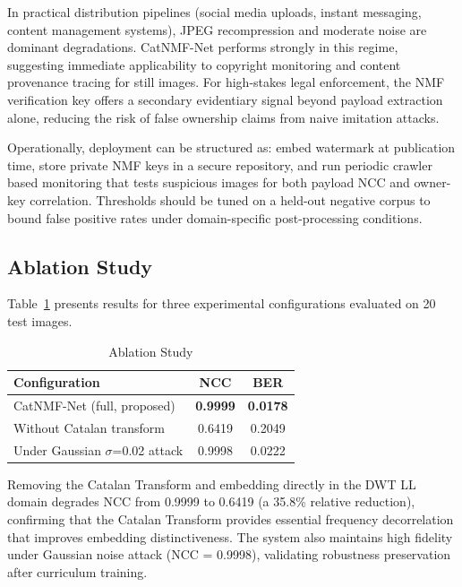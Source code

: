 \documentclass[journal]{IEEEtran}
\begin{document}
In practical distribution pipelines (social media uploads, instant messaging,
content management systems), JPEG recompression and moderate noise are dominant
degradations. CatNMF-Net performs strongly in this regime, suggesting immediate
applicability to copyright monitoring and content provenance tracing for still
images. For high-stakes legal enforcement, the NMF verification key offers a
secondary evidentiary signal beyond payload extraction alone, reducing the
risk of false ownership claims from naive imitation attacks.

Operationally, deployment can be structured as: embed watermark at publication
time, store private NMF keys in a secure repository, and run periodic crawler
based monitoring that tests suspicious images for both payload NCC and owner-key
correlation. Thresholds should be tuned on a held-out negative corpus to bound
false positive rates under domain-specific post-processing conditions.

\subsection{Ablation Study}

Table~\ref{tab:ablation} presents results for three experimental
configurations evaluated on 20 test images.

\begin{table}[!t]
  \renewcommand{\arraystretch}{1.3}
  \caption{Ablation Study}
  \label{tab:ablation}
  \centering
  \begin{tabular}{lcc}
    \toprule
    Configuration & NCC & BER \\
    \midrule
    CatNMF-Net (full, proposed) & \textbf{0.9999} & \textbf{0.0178} \\
    Without Catalan transform   & 0.6419 & 0.2049 \\
    Under Gaussian $\sigma$=0.02 attack & 0.9998 & 0.0222 \\
    \bottomrule
  \end{tabular}
\end{table}

Removing the Catalan Transform and embedding directly in the DWT LL
domain degrades NCC from 0.9999 to 0.6419 (a 35.8\% relative reduction),
confirming that the Catalan Transform provides essential frequency
decorrelation that improves embedding distinctiveness. The system also
maintains high fidelity under Gaussian noise attack (NCC = 0.9998),
validating robustness preservation after curriculum training.
\end{document}
